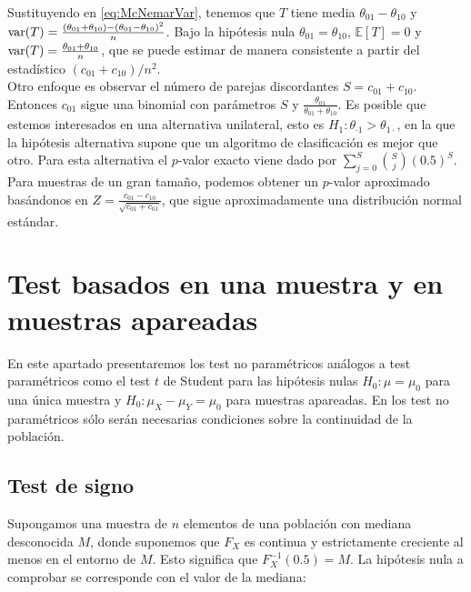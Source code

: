 	Sustituyendo en \ref{eq:McNemarVar}, tenemos que $T$ 
tiene media $\theta_{01}-\theta_{10}$ y $\text{var}(T) = 
\frac{(\theta_{01} + \theta_{10}) - (\theta_{01} - 
\theta_{10})^2 }{n}$. Bajo la hipótesis nula $\theta_{01} = 
\theta_{10}$, $\mathbb{E}[T] = 0$ y $\text{var}(T) = \frac{\theta_{01}+
\theta_{10}}{n}$, que se puede estimar de manera consistente 
a partir del estadístico $(c_{01} + c_{10})/n^2$.\\
	Otro enfoque es observar el número de parejas 
discordantes $S = c_{01} + c_{10}$. Entonces $c_{01}$ sigue 
una binomial con parámetros $S$ y $\frac{\theta_{01}}
{\theta_{01}+\theta_{10}}$. Es posible que estemos 
interesados en una alternativa unilateral, esto es $H_1: 
\theta_{\cdot 1} > \theta_{1 \cdot}$, en la que la hipótesis 
alternativa supone que un algoritmo de clasificación es mejor 
que otro. Para esta alternativa el $p$-valor exacto viene 
dado por $\sum\limits_{j=0}^S {S \choose j}(0.5)^S$. Para 
muestras de un gran tamaño, podemos obtener un $p$-valor 
aproximado basándonos en $Z = \frac{c_{01} - c_{10}}
{\sqrt{c_{01} + c_{01}}}$, que sigue aproximadamente una 
distribución normal estándar.
	
\section{Test basados en una muestra y en muestras apareadas}
	
	En este apartado presentaremos los test no paramétricos 
análogos a test paramétricos como el test $t$ de Student para 
las hipótesis nulas $H_0: \mu = \mu_0$ para una única muestra 
y $H_0: \mu_X - \mu_Y = \mu_0$ para muestras apareadas. En 
los test no paramétricos sólo serán necesarias condiciones 
sobre la continuidad de la población. 
	
\subsection{Test de signo}

	Supongamos una muestra de $n$ elementos de una población 
con mediana desconocida $M$, donde suponemos que $F_X$ 
es continua y estrictamente creciente al menos en el entorno 
de $M$. Esto significa que $F_X^{-1}(0.5) = M$. La hipótesis 
nula a comprobar se corresponde con el valor de la mediana:

